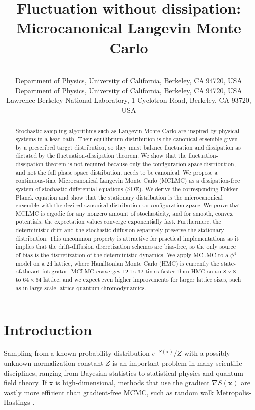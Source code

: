 \documentclass[tablecaption=bottom,wcp]{jmlr} %
\title[Microcanonical Langevin Monte Carlo]{Fluctuation without dissipation: Microcanonical Langevin Monte Carlo}
\author{
\Name{Jakob Robnik} \Email{jakob\_robnik@berkeley.edu} \\
\addr Department of Physics, University of California, Berkeley, CA 94720, USA
\AND
\Name{Uro\v{s} Seljak} \Email{useljak@berkeley.edu} \\
\addr Department of Physics, University of California, Berkeley, CA 94720, USA \\
Lawrence Berkeley National Laboratory, 1 Cyclotron Road, Berkeley, CA 93720, USA
}
\newcommand{\x}{\boldsymbol{x}}
\begin{document}
\maketitle

\begin{abstract}
Stochastic sampling algorithms such as Langevin Monte Carlo are inspired by physical systems in a heat bath. Their equilibrium distribution is the canonical ensemble given by a prescribed target distribution, so they must balance fluctuation and dissipation as dictated by the fluctuation-dissipation theorem. We show that the fluctuation-dissipation theorem is not required because only the configuration space distribution, and not the full phase space distribution, needs to be canonical. We propose a continuous-time Microcanonical Langevin Monte Carlo (MCLMC) as a dissipation-free system of stochastic differential equations (SDE). We derive the corresponding Fokker-Planck equation and show that the stationary distribution is the microcanonical ensemble with the desired canonical distribution on configuration space. We prove that MCLMC is ergodic for any nonzero amount of stochasticity, and for smooth, convex potentials, the expectation values converge exponentially fast. Furthermore, the deterministic drift and the stochastic diffusion separately preserve the stationary distribution. This uncommon property is attractive for practical implementations as it implies that the drift-diffusion discretization schemes are bias-free, so the only source of bias is the discretization of the deterministic dynamics. We apply MCLMC to a $\phi^4$ model on a 2d lattice, where Hamiltonian Monte Carlo (HMC) is currently the state-of-the-art integrator. MCLMC converges 12 to 32 times faster than HMC on an $8\times8$ to $64\times64$ lattice, and we expect even higher improvements for larger lattice sizes, such as in large scale lattice quantum chromodynamics.
\end{abstract}



\section{Introduction}

Sampling from a known probability distribution $e^{-S(\x)} / Z$ with a possibly unknown normalization constant $Z$ is an important problem in many scientific disciplines, ranging from Bayesian statistics to statistical physics and quantum field theory. If $\x$ is high-dimensional, methods that use the gradient $\nabla S(\x)$ are vastly more efficient than gradient-free MCMC, such as random walk Metropolis-Hastings \citep{Metropolis}. 
\end{document}

